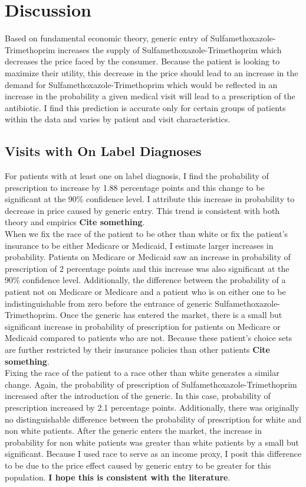 \chapter{Discussion}
Based on fundamental economic theory, generic entry of Sulfamethoxazole-Trimethoprim increases the supply of Sulfamethoxazole-Trimethoprim which decreases the price faced by the consumer. Because the patient is looking to maximize their utility, this decrease in the price should lead to an increase in the demand for Sulfamethoxazole-Trimethoprim which would be reflected in an increase in the probability a given medical visit will lead to a prescription of the antibiotic. I find this prediction is accurate only for certain groups of patients within the data and varies by patient and visit characteristics.\\
\section{Visits with On Label Diagnoses}
\indent For patients with at least one on label diagnosis, I find the probability of prescription to increase by 1.88 percentage points and this change to be significant at the 90\% confidence level. I attribute this increase in probability to decrease in price caused by generic entry. This trend is consistent with both theory and empirics \textbf{Cite something}.\\
\indent When we fix the race of the patient to be other than white or fix the patient's insurance to be either Medicare or Medicaid, I estimate larger increases in probability. Patients on Medicare or Medicaid saw an increase in probability of prescription of 2 percentage points and this increase was also significant at the 90\% confidence level. Additionally, the difference between the probability of a patient not on Medicare or Medicare and a patient who is on either one to be indistinguishable from zero before the entrance of generic Sulfamethoxazole-Trimethoprim. Once the generic has entered the market, there is a small but significant increase in probability of prescription for patients on Medicare or Medicaid compared to patients who are not. Because these patient's choice sets are further restricted by their insurance policies than other patients \textbf{Cite something}.\\
\indent Fixing the race of the patient to a race other than white generates a similar change. Again, the probability of prescription of Sulfamethoxazole-Trimethoprim increased after the introduction of the generic. In this case, probability of prescription increased by 2.1 percentage points. Additionally, there was originally no distinguishable difference between the probability of prescription for white and non white patients. After the generic enters the market, the increase in probability for non white patients was greater than white patients by a small but significant. Because I used race to serve as an income proxy, I posit this difference to be due to the price effect caused by generic entry to be greater for this population. \textbf{I hope this is consistent with the literature}.\\
